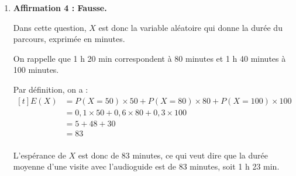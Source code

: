 \documentclass[10pt]{article}
\begin{document}
\begin{enumerate}
	L'événement \og{}exactement la moitié des 12 visiteurs opte pour l'audioguide\fg{} est donc l'événement $\{X = 6\}$ : la moitié (6 visiteurs) opte pour l'audioguide, et donc l'autre moitié (les 6 autres visiteurs) refusent l'audioguide.

	Par propriété, on a :\quad $P(X = 6) = \displaystyle \binom{12}{6} \times 0,32^6 \times (1 - 0,32)^6$.

	Or :\quad $\displaystyle \binom{12}{6} = \dfrac{12 !}{6! \times 6!} = 924$

	et :\quad $0,32^6 \times (1-0,32)^6 = 0,32^6 \times 0,68^6 = \left(0,32 \times 0,68\right)^6 = 0,2176^6$.

	On a donc bien :\quad $P(X = 6) = \displaystyle \binom{12}{6} \times 0,32^6 \times (1 - 0,32)^6 = 924 \times 0,2176^6$.

	\item \textbf{Affirmation 4 : Fausse.}

	Dans cette question, $X$ est donc la variable aléatoire qui donne la durée du parcours, exprimée en minutes.

	On rappelle que 1 h 20 min correspondent à 80 minutes et 1 h 40 minutes à 100 minutes.

	Par définition, on a : \quad $\begin{aligned}[t]
		E(X) &= P(X = 50) \times 50 + P(X = 80) \times 80 + P(X = 100) \times 100\\
		&= 0,1 \times 50 + 0,6 \times 80 + 0,3 \times 100\\
		&= 5 + 48 + 30\\
		&= 83\\
	\end{aligned}$

	L'espérance de $X$ est donc de 83 minutes, ce qui veut dire que la durée moyenne d'une visite avec l'audioguide est de 83 minutes, soit 1 h 23 min.
	\end{enumerate}
\end{document}
